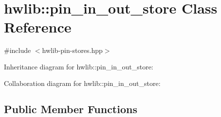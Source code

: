 \hypertarget{classhwlib_1_1pin__in__out__store}{}\section{hwlib\+:\+:pin\+\_\+in\+\_\+out\+\_\+store Class Reference}
\label{classhwlib_1_1pin__in__out__store}


{\ttfamily \#include $<$hwlib-\/pin-\/stores.\+hpp$>$}



Inheritance diagram for hwlib\+:\+:pin\+\_\+in\+\_\+out\+\_\+store\+:


Collaboration diagram for hwlib\+:\+:pin\+\_\+in\+\_\+out\+\_\+store\+:
\subsection*{Public Member Functions}
